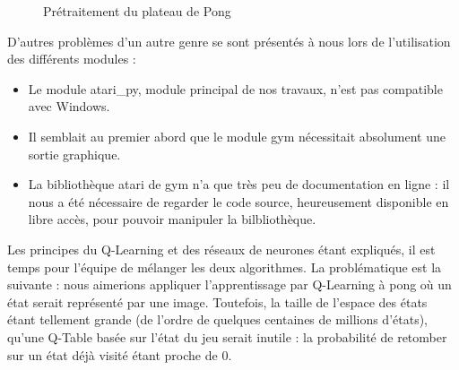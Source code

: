 \documentclass[
    10pt,
    a4paper,
    oneside,
    headinclude,footinclude,
    BCOR=5mm,
    captions=tableabove
]{scrartcl}
\begin{document}
\begin{figure}
\centering
\caption{Prétraitement du plateau de Pong}
\label{fig:pong-plateau}
\end{figure}

D'autres problèmes d'un autre genre se sont présentés à nous lors de l'utilisation des différents modules :
\begin{itemize}
	\item Le module atari\_py, module principal de nos travaux, n'est pas compatible avec Windows.
	\item Il semblait au premier abord que le module gym nécessitait absolument une sortie graphique.
	\item La bibliothèque atari de gym n'a que très peu de documentation en ligne : il nous a été nécessaire de regarder le code source, heureusement disponible en libre accès, pour pouvoir manipuler la bilbliothèque.
\end{itemize}

Les principes du Q-Learning et des réseaux de neurones étant expliqués, il est temps pour l’équipe de mélanger les deux algorithmes. La problématique est la suivante : nous aimerions appliquer l’apprentissage par Q-Learning à pong où un état serait représenté par une image. Toutefois, la taille de l’espace des états étant tellement grande (de l’ordre de quelques centaines de millions d’états), qu’une Q-Table basée sur l’état du jeu serait inutile : la probabilité de retomber sur un état déjà visité étant proche de 0.
\end{document}
